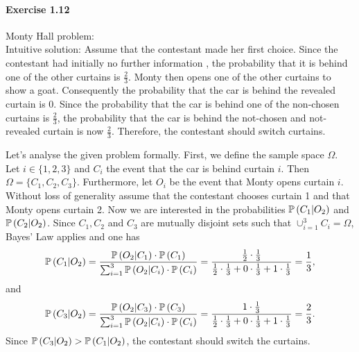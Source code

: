 \paragraph{Exercise 1.12} Monty Hall problem: \\
Intuitive solution: Assume that the contestant made her first choice. Since the
contestant had initially no further information , the probability that it is
behind one of the other curtains is $\frac{2}{3}$. Monty then opens one of the
other curtains to show a goat. Consequently the probability that the car is behind
the revealed curtain is 0. Since the probability that the car is behind one
of the non-chosen curtains is $\frac{2}{3}$, the probability that the car is behind
the not-chosen and not-revealed curtain is now $\frac{2}{3}$. Therefore, the
contestant should switch curtains.

Let's analyse the given problem formally. First, we define the sample space $\Omega$.
Let $i \in \{ 1, 2, 3 \}$ and $C_i$ the event that the car is behind curtain $i$.
Then $\Omega = \{ C_1, C_2, C_3 \}$. Furthermore, let $O_i$ be the event that Monty
opens curtain $i$. Without loss of generality assume that the contestant chooses
curtain 1 and that Monty opens curtain 2. Now we are interested in the probabilities
$\mathbb{P}\left(C_1 | O_2\right)$ and $\mathbb{P}\left(C_2 | O_2\right)$. Since $C_1, C_2$ and
$C_3$ are mutually disjoint sets such that $\cup_{i=1}^3 C_i = \Omega$, Bayes' Law
applies and one has
\[
  \mathbb{P}\left(C_1 | O_2\right)
    = \frac {\mathbb{P}\left(O_2 | C_1\right) \cdot \mathbb{P}\left(C_1 \right)} {\sum_{i=1}^3 \mathbb{P}\left(O_2 | C_i\right) \cdot \mathbb{P}\left(C_i\right)}
    = \frac {\frac{1}{2} \cdot \frac{1}{3}}{\frac{1}{2} \cdot \frac{1}{3} + 0 \cdot \frac{1}{3} + 1 \cdot \frac{1}{3}}
    = \frac{1}{3},
\]
and
\[
  \mathbb{P}\left(C_3 | O_2\right)
    = \frac {\mathbb{P}\left(O_2 | C_3\right) \cdot \mathbb{P}\left(C_3 \right)}{\sum_{i=1}^3 \mathbb{P}\left(O_2 | C_i\right) \cdot \mathbb{P}\left(C_i\right)}
    = \frac {1 \cdot \frac{1}{3}}{\frac{1}{2} \cdot \frac{1}{3} + 0 \cdot \frac{1}{3} + 1 \cdot \frac{1}{3}}
    = \frac{2}{3}.
\]
Since $\mathbb{P}\left(C_3 | O_2\right) > \mathbb{P}\left(C_1 | O_2\right)$, the contestant
should switch the curtains.
